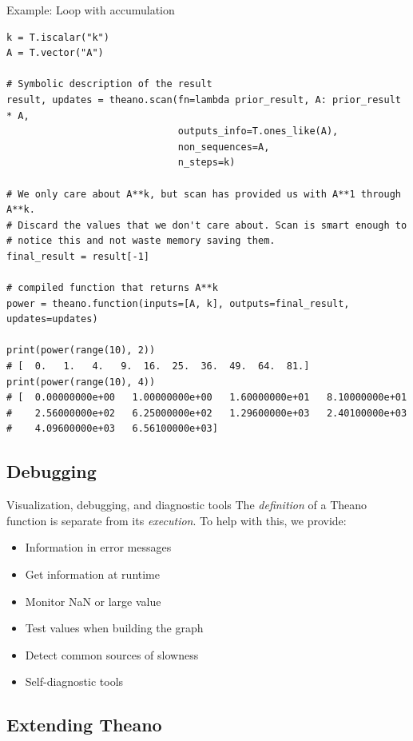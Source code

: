 \documentclass[a4paper,9pt]{beamer}
\begin{document}
\begin{frame}[fragile]{Example: Loop with accumulation}
  \footnotesize
    \begin{verbatim}
k = T.iscalar("k")
A = T.vector("A")

# Symbolic description of the result
result, updates = theano.scan(fn=lambda prior_result, A: prior_result * A,
                              outputs_info=T.ones_like(A),
                              non_sequences=A,
                              n_steps=k)

# We only care about A**k, but scan has provided us with A**1 through A**k.
# Discard the values that we don't care about. Scan is smart enough to
# notice this and not waste memory saving them.
final_result = result[-1]

# compiled function that returns A**k
power = theano.function(inputs=[A, k], outputs=final_result, updates=updates)

print(power(range(10), 2))
# [  0.   1.   4.   9.  16.  25.  36.  49.  64.  81.]
print(power(range(10), 4))
# [  0.00000000e+00   1.00000000e+00   1.60000000e+01   8.10000000e+01
#    2.56000000e+02   6.25000000e+02   1.29600000e+03   2.40100000e+03
#    4.09600000e+03   6.56100000e+03]
  \end{verbatim}
\end{frame}

\subsection{Debugging}
\begin{frame}[fragile]{Visualization, debugging, and diagnostic tools}
  The \emph{definition} of a Theano function is separate from its \emph{execution}.
  To help with this, we provide:
  \begin{itemize}
    \item Information in error messages
    \item Get information at runtime
    \item Monitor NaN or large value
    \item Test values when building the graph
    \item Detect common sources of slowness
    \item Self-diagnostic tools
  \end{itemize}
\end{frame}

\subsection{Extending Theano}
\end{document}
